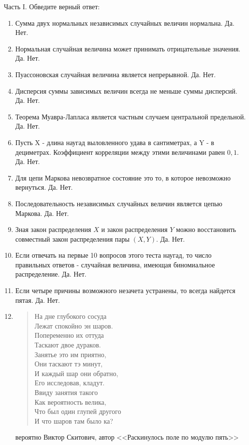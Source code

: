 \documentclass[pdftex,12pt,a4paper]{article}
\begin{document}
Часть I. Обведите верный ответ:
\begin{enumerate}
\item Сумма двух нормальных независимых случайных величин нормальна. Да. Нет.

\item Нормальная случайная величина может принимать отрицательные значения. Да. Нет.

\item Пуассоновская случайная величина является непрерывной. Да. Нет.

\item Дисперсия суммы зависимых величин всегда не меньше суммы дисперсий. Да. Нет.

\item Теорема Муавра-Лапласа является частным случаем центральной предельной. Да. Нет.

\item Пусть X - длина наугад выловленного удава в сантиметрах, а Y - в дециметрах. Коэффициент корреляции между этими величинами равен $0,1$. Да. Нет.

\item Для цепи Маркова невозвратное состояние это то, в которое невозможно вернуться. Да. Нет.

\item Последовательность  независимых случайных величин является цепью Маркова. Да. Нет.

\item Зная закон распределения $X$ и закон распределения $Y$ можно восстановить совместный
закон распределения пары $(X,Y)$. Да. Нет.

\item Если отвечать на первые 10 вопросов этого теста наугад, то число правильных ответов - случайная величина, имеющая биномиальное распределение. Да. Нет.

\item Если четыре причины возможного незачета устранены, то всегда найдется пятая. Да. Нет.

\item 
\begin{flushleft}
\begin{verse}
На дне глубокого сосуда \\
Лежат спокойно эн шаров. \\
Попеременно их оттуда \\
Таскают двое дураков. \\
Занятье это им приятно, \\
Они таскают тэ минут, \\
И каждый шар они обратно, \\
Его исследовав, кладут. \\
Ввиду занятия такого \\
Как вероятность велика, \\
Что был один глупей другого \\
И что шаров там было ка? 
\end{verse}
\end{flushleft}
вероятно Виктор Скитович, автор <<Раскинулось поле по модулю пять>> 

\end{enumerate}
\end{document}
